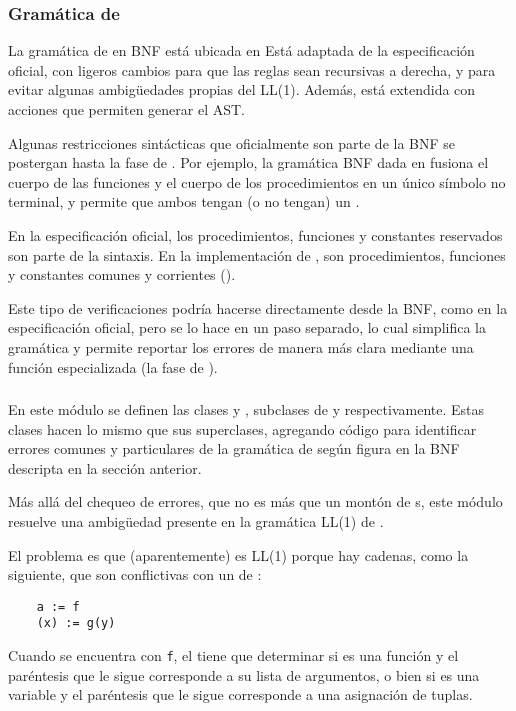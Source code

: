 \documentclass{article}
\begin{document}
\subsubsection{Gram\'atica de \Gbs}

La gram\'atica de \Gbs en BNF est\'a ubicada en 
Est\'a adaptada de la especificaci\'on oficial, con ligeros
cambios para que las reglas sean recursivas a derecha, y para
evitar algunas ambig\"uedades propias del  LL(1).
Adem\'as, est\'a extendida con acciones que permiten generar
el AST.

Algunas restricciones sint\'acticas que oficialmente son parte de
la BNF se postergan hasta la fase de . Por ejemplo, la
gram\'atica BNF dada en  fusiona el
cuerpo de las funciones y el cuerpo de los procedimientos
en un \'unico s\'imbolo no terminal, y permite que ambos
tengan (o no tengan) un .

En la especificaci\'on oficial, los procedimientos, funciones
y constantes reservados son parte de la sintaxis. En la
implementaci\'on de \PGbs, son procedimientos, funciones
y constantes comunes y corrientes ().

Este tipo de verificaciones podr\'ia hacerse directamente
desde la BNF, como en la especificaci\'on oficial, pero se lo hace
en un paso separado, lo cual simplifica la gram\'atica y
permite reportar los errores de manera m\'as clara mediante
una funci\'on especializada (la fase de ).

\subsubsection{}

En este m\'odulo se definen las clases  y
, subclases de 
y  respectivamente.
Estas clases hacen lo mismo que sus superclases,
agregando c\'odigo para identificar errores comunes
y particulares de la gram\'atica de \Gbs seg\'un
figura en la BNF descripta en la secci\'on anterior.

M\'as all\'a del chequeo de errores, que no es m\'as que
un mont\'on de s, este m\'odulo resuelve una
ambig\"uedad presente en la gram\'atica LL(1) de \Gbs.

El problema es que \Gbs (aparentemente)  es LL(1) porque hay
cadenas, como la siguiente, que son conflictivas con un
 de :
\begin{verbatim}
    a := f
    (x) := g(y)
\end{verbatim}
Cuando se encuentra con \verb|f|, el  tiene que
determinar si  es una funci\'on y el par\'entesis que
le sigue corresponde a su lista de argumentos, o bien si
 es una variable y el par\'entesis que le sigue
corresponde a una asignaci\'on de tuplas.
\end{document}
